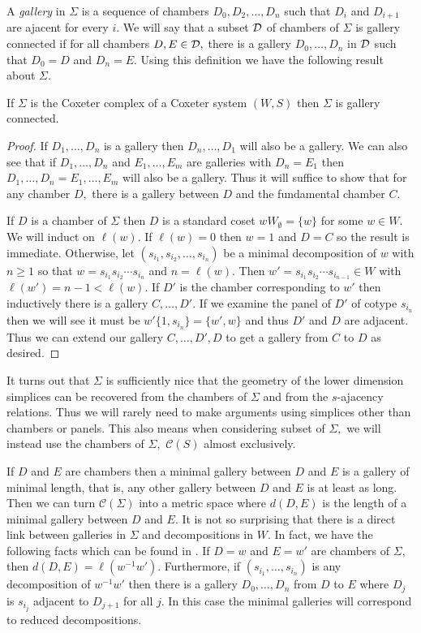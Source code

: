 \documentclass[class=book, crop=false,12 pt]{standalone}
\begin{document}
A \emph{gallery} in $\Sigma$ is a sequence of chambers $D_0,D_2,\dots,D_n$ such that $D_i$ and $D_{i+1}$ are ajacent for every $i.$ We will say that a subset $\mathcal{D}$ of chambers of $\Sigma$ is gallery connected if for all chambers $D,E\in \mathcal{D},$ there is a gallery $D_0,\dots,D_n$ in $\mathcal{D}$ such that $D_0=D$ and $D_n=E.$ Using this definition we have the following result about $\Sigma.$
\begin{prop}
	\label{prop:gallerycon}
	If $\Sigma$ is the Coxeter complex of a Coxeter system $(W,S)$ then $\Sigma$ is gallery connected.
\end{prop}
\begin{proof}
	If $D_1,\dots,D_n$ is a gallery then $D_n,\dots,D_1$ will also be a gallery. We can also see that if $D_1,\dots,D_n$ and $E_1,\dots,E_m$ are galleries with $D_n=E_1$ then $D_1,\dots,D_n=E_1,\dots,E_m$ will also be a gallery. Thus it will suffice to show that for any chamber $D,$ there is a gallery between $D$ and the fundamental chamber $C.$

	If $D$ is a chamber of $\Sigma$ then $D$ is a standard coset $wW_\emptyset=\{w\}$ for some $w\in W.$ We will induct on $\ell(w).$ If $\ell(w)=0$ then $w=1$ and $D=C$ so the result is immediate. Otherwise, let $(s_{i_1},s_{i_2},\dots,s_{i_n})$ be a minimal decomposition of $w$ with $n\ge 1$ so that $w=s_{i_1}s_{i_2}\cdots s_{i_n}$ and $n=\ell(w).$ Then $w'=s_{i_1}s_{i_2}\cdots s_{i_{n-1}}\in W$ with $\ell(w')=n-1<\ell(w).$ If $D'$ is the chamber corresponding to $w'$ then inductively there is a gallery $C,\dots,D'.$ If we examine the panel of $D'$ of cotype $s_{i_n}$ then we will see it must be $w'\{1,s_{i_n}\}=\{w',w\}$ and thus $D'$ and $D$ are adjacent. Thus we can extend our gallery $C,\dots,D',D$ to get a gallery from $C$ to $D$ as desired.
\end{proof}

It turns out that $\Sigma$ is sufficiently nice that the geometry of the lower dimension simplices can be recovered from the chambers of $\Sigma$ and from the $s$-ajacency relations. Thus we will rarely need to make arguments using simplices other than chambers or panels. This also means when considering subset of $\Sigma,$ we will instead use the chambers of $\Sigma,$ $\mathcal{C}(S)$ almost exclusively.

If $D$ and $E$ are chambers then a minimal gallery between $D$ and $E$ is a gallery of minimal length, that is, any other gallery between $D$ and $E$ is at least as long. Then we can turn $\mathcal{C}(\Sigma)$ into a metric space where $d(D,E)$ is the length of a minimal gallery between $D$ and $E.$ It is not so surprising that there is a direct link between galleries in $\Sigma$ and decompositions in $W.$ In fact, we have the following facts which can be found in \cite{buildings}. If $D=w$ and $E=w'$ are chambers of $\Sigma,$ then $d(D,E)=\ell(w^{-1}w').$ Furthermore, if $(s_{i_1},\dots,s_{i_n})$ is any decomposition of $w^{-1}w'$ then there is a gallery $D_0,\dots,D_n$ from $D$ to $E$ where $D_j$ is $s_{i_j}$ adjacent to $D_{j+1}$ for all $j.$ In this case the minimal galleries will correspond to reduced decompositions.
\end{document}
